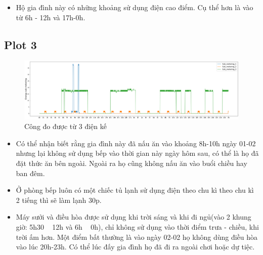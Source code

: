 \documentclass[a4paper, 12pt]{article}
\begin{document}
        \begin{itemize}
            \item Hộ gia đình này có những khoảng sử dụng điện cao điểm. Cụ thể hơn là vào từ 6h - 12h và 17h-0h.
        \end{itemize}
        
    \subsection{Plot 3}
        \begin{figure}[H]
            \centering
            \includegraphics[scale=0.3]{img/meterings.png}
            \caption{Công đo được từ 3 điện kế}
        \end{figure}
        
        \begin{itemize}
            \item Có thể nhận biết rằng gia đình này đã nấu ăn vào khoảng 8h-10h ngày 01-02 nhưng lại không sử dụng bếp vào thời gian này ngày hôm sau, có thể là họ đã đặt thức ăn bên ngoài. Ngoài ra họ cũng không nấu ăn vào buổi chiều hay ban đêm. 
            \item Ở phòng bếp luôn có một chiếc tủ lạnh sử dụng điện theo chu kì theo chu kì 2 tiếng thì sẽ làm lạnh 30p. 
            \item Máy sưởi và điều hòa được sử dụng khi trời sáng và khi đi ngủ(vào 2 khung giờ: 5h30 ~ 12h và 6h ~ 0h), chỉ không sử dụng vào thời điểm trưa - chiều, khi trời ấm hơn. Một điểm bất thường là vào ngày 02-02 họ không dùng điều hòa vào lúc 20h-23h. Có thể lúc đấy gia đình họ đã đi ra ngoài chơi hoặc dự tiệc.
        \end{itemize}
        
\end{document}
